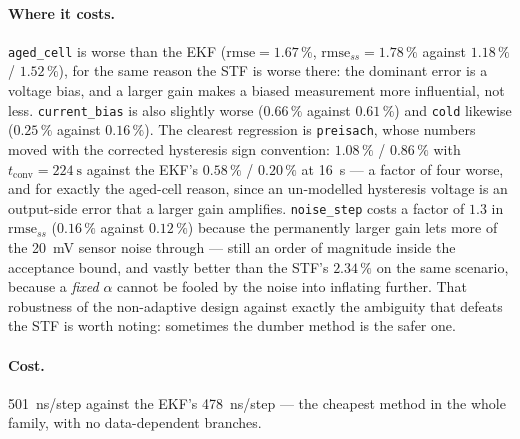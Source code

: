 \paragraph{Where it costs.}  \texttt{aged\_cell} is worse than the EKF ($\mathrm{rmse}=1.67\,\%$,
$\mathrm{rmse}_{ss}=1.78\,\%$ against $1.18\,\%$ / $1.52\,\%$), for the same reason the STF is worse
there: the dominant error is a voltage bias, and a larger gain makes a biased measurement more
influential, not less.  \texttt{current\_bias} is also slightly worse ($0.66\,\%$ against $0.61\,\%$)
and \texttt{cold} likewise ($0.25\,\%$ against $0.16\,\%$).  The clearest regression is
\texttt{preisach}, whose numbers moved with the corrected hysteresis sign convention: $1.08\,\%$ /
$0.86\,\%$ with $t_\mathrm{conv}=\SI{224}{\second}$ against the EKF's $0.58\,\%$ / $0.20\,\%$ at
\SI{16}{\second} --- a factor of four worse, and for exactly the aged-cell reason, since an
un-modelled hysteresis voltage is an output-side error that a larger gain amplifies.
\texttt{noise\_step} costs a factor of $1.3$ in $\mathrm{rmse}_{ss}$ ($0.16\,\%$ against $0.12\,\%$)
because the permanently larger gain lets more of the \SI{20}{\milli\volt} sensor noise through ---
still an order of magnitude inside the acceptance bound, and vastly better than the STF's $2.34\,\%$
on the same scenario, because a \emph{fixed} $\alpha$ cannot be fooled by the noise into inflating
further.  That robustness of the non-adaptive design against exactly the ambiguity that defeats the
STF is worth noting: sometimes the dumber method is the safer one.

\paragraph{Cost.}  \SI{501}{\nano\second}/step against the EKF's \SI{478}{\nano\second}/step --- the
cheapest method in the whole family, with no data-dependent branches.

